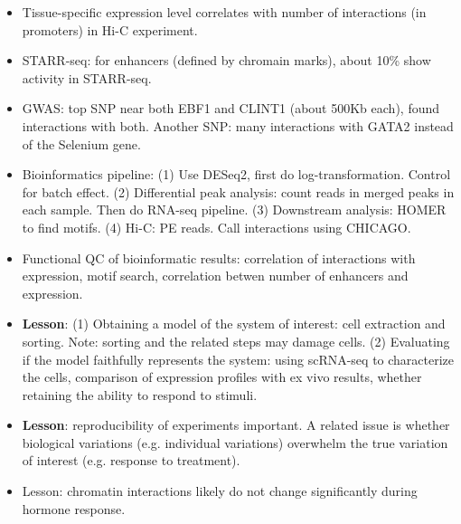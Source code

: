 \documentclass{report}
\begin{document}
\begin{itemize}
	\item Tissue-specific expression level correlates with number of interactions (in promoters) in Hi-C experiment.
	
	\item STARR-seq: for enhancers (defined by chromain marks), about 10\% show activity in STARR-seq.
	
	\item GWAS: top SNP near both EBF1 and CLINT1 (about 500Kb each), found interactions with both. Another SNP: many interactions with GATA2 instead of the Selenium gene.
	
	\item Bioinformatics pipeline: (1) Use DESeq2, first do log-transformation. Control for batch effect. (2) Differential peak analysis: count reads in merged peaks in each sample. Then do RNA-seq pipeline. (3) Downstream analysis: HOMER to find motifs. (4) Hi-C: PE reads. Call interactions using CHICAGO.
	
	\item Functional QC of bioinformatic results: correlation of interactions with expression, motif search, correlation betwen number of enhancers and expression.
	
	\item \textbf{Lesson}: (1) Obtaining a model of the system of interest: cell extraction and sorting. Note: sorting and the related steps may damage cells. (2) Evaluating if the model faithfully represents the system: using scRNA-seq to characterize the cells, comparison of expression profiles with ex vivo results, whether retaining the ability to respond to stimuli.
	
	\item \textbf{Lesson}: reproducibility of experiments important. A related issue is whether biological variations (e.g. individual variations) overwhelm the true variation of interest (e.g. response to treatment).
	
	\item Lesson: chromatin interactions likely do not change significantly during hormone response. 
\end{itemize}

\end{document}
